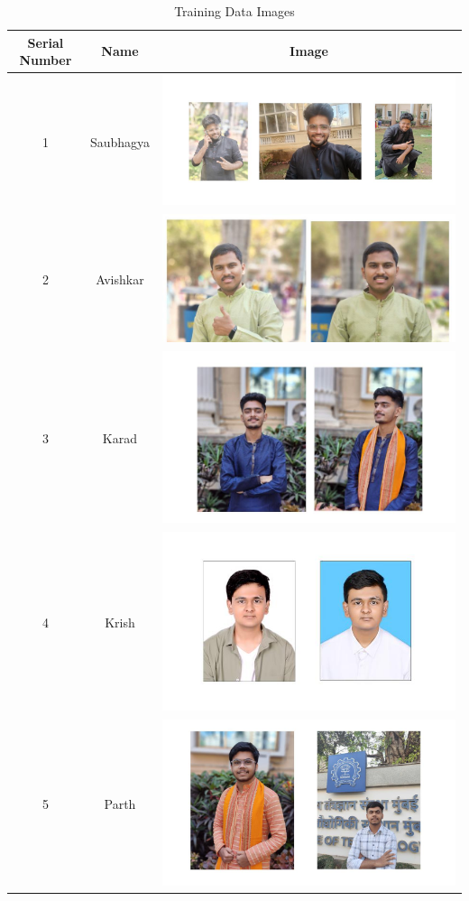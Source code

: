 \documentclass[openany]{report}
\begin{document}
\begin{table}[H]
    \centering
    \begin{tabular}{|c|c|c|}
        \hline
        \textbf{Serial Number} & \textbf{Name} & \textbf{Image}                                        \\
        \hline
        1                      & Saubhagya     & \includegraphics[height=.25\textwidth]{../imgs/saubhagya.jpg} \\
        \hline
        2                      & Avishkar      & \includegraphics[height=.25\textwidth]{../imgs/avishkar.jpg}  \\
        \hline
        3                      & Karad         & \includegraphics[height=.25\textwidth]{../imgs/karad.jpg}     \\
        \hline
        4                      & Krish         & \includegraphics[height=.25\textwidth]{../imgs/krish.jpg}     \\
        \hline
        5                      & Parth         & \includegraphics[height=.25\textwidth]{../imgs/parth.jpg}     \\
        \hline
    \end{tabular}
    \caption{Training Data Images}
\end{table}
\end{document}

